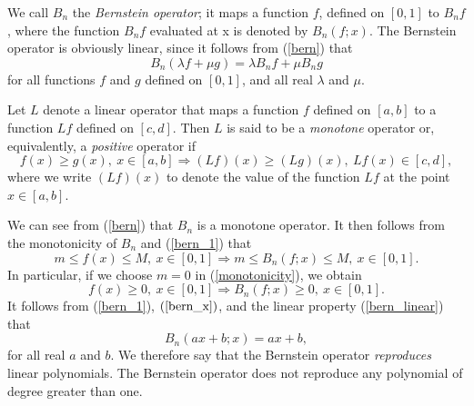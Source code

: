 \documentclass[12pt]{article}
\begin{document}
We call $B_n$ the \textit{Bernstein operator}; it maps a function $f$, defined on $[0, 1]$ to $B_nf$, where the function $B_nf$ evaluated at x is denoted by $B_n(f;x).$ The Bernstein operator is obviously linear, since it follows from (\ref{bern}) that \begin{equation}
B_n(\lambda f + \mu g) = \lambda B_{n}f + \mu B_{n}g
\label{bern_linear}
\end{equation}
for all functions $f$ and $g$ defined on $[0, 1]$, and all real $\lambda$ and $\mu$.
\begin{definition}
Let $L$ denote a linear operator that maps a function $f$ defined on $[a, b]$ to a function $Lf$ defined on $[c, d]$. Then $L$ is said to be a \textit{monotone} operator or, equivalently, a \textit{positive} operator if \begin{equation}
    f(x) \geq g(x), \ x \in [a, b] \Rightarrow (Lf)(x) \geq (Lg)(x), \ Lf(x) \in [c, d],
\end{equation} 
where we write $(Lf)(x)$ to denote the value of the function $Lf$ at the point $x \in [a, b]$.
\end{definition}
We can see from (\ref{bern}) that $B_n$ is a monotone operator. It then follows from the monotonicity of $B_n$ and (\ref{bern_1}) that
\begin{equation}
m \leq f(x) \leq M, \ x \in [0, 1] \Rightarrow m \leq B_n(f;x) \leq M, \ x \in [0, 1].
\label{monotonicity}
\end{equation}
In particular, if we choose $m=0$ in (\ref{monotonicity}), we obtain
\begin{equation}
  f(x) \geq 0, \ x \in [0, 1] \Rightarrow B_n(f;x) \geq 0, \ x \in [0, 1].
\end{equation}
It follows from (\ref{bern_1}), $(\ref{bern_x})$, and the linear property (\ref{bern_linear}) that
\begin{equation}
    B_n(ax+b;x) = ax + b,
\end{equation}
for all real $a$ and $b$. We therefore say that the Bernstein operator \textit{reproduces} linear polynomials. The Bernstein operator does not reproduce any polynomial of degree greater than one\cite{phillips2003interpolation}.



\newpage
\end{document}
